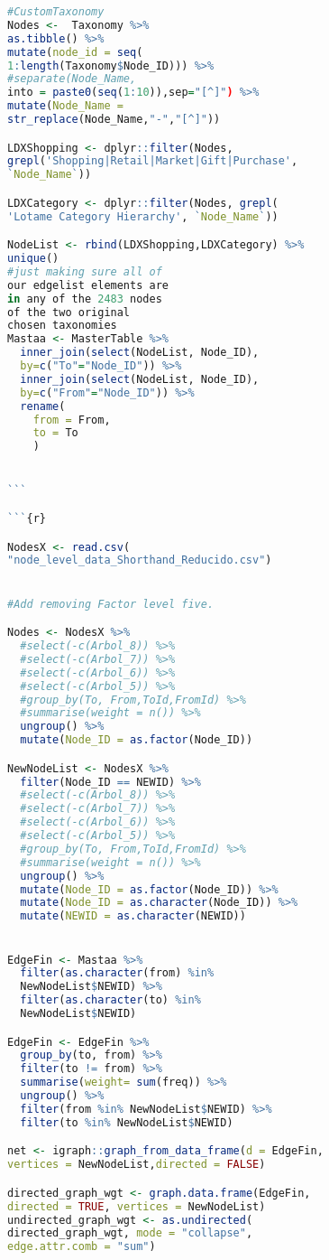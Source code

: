 \begin{lstlisting}[language=R]
#CustomTaxonomy
Nodes <-  Taxonomy %>% 
as.tibble() %>%
mutate(node_id = seq(
1:length(Taxonomy$Node_ID))) %>% 
#separate(Node_Name,
into = paste0(seq(1:10)),sep="[^]") %>% 
mutate(Node_Name = 
str_replace(Node_Name,"-","[^]"))

LDXShopping <- dplyr::filter(Nodes, 
grepl('Shopping|Retail|Market|Gift|Purchase',
`Node_Name`))

LDXCategory <- dplyr::filter(Nodes, grepl(
'Lotame Category Hierarchy', `Node_Name`))

NodeList <- rbind(LDXShopping,LDXCategory) %>% 
unique()
#just making sure all of 
our edgelist elements are 
in any of the 2483 nodes 
of the two original 
chosen taxonomies
Mastaa <- MasterTable %>% 
  inner_join(select(NodeList, Node_ID),
  by=c("To"="Node_ID")) %>% 
  inner_join(select(NodeList, Node_ID), 
  by=c("From"="Node_ID")) %>% 
  rename(
    from = From,
    to = To
    )


```

```{r}

NodesX <- read.csv(
"node_level_data_Shorthand_Reducido.csv")


#Add removing Factor level five.

Nodes <- NodesX %>% 
  #select(-c(Arbol_8)) %>% 
  #select(-c(Arbol_7)) %>% 
  #select(-c(Arbol_6)) %>% 
  #select(-c(Arbol_5)) %>% 
  #group_by(To, From,ToId,FromId) %>% 
  #summarise(weight = n()) %>% 
  ungroup() %>% 
  mutate(Node_ID = as.factor(Node_ID))

NewNodeList <- NodesX %>% 
  filter(Node_ID == NEWID) %>% 
  #select(-c(Arbol_8)) %>% 
  #select(-c(Arbol_7)) %>% 
  #select(-c(Arbol_6)) %>% 
  #select(-c(Arbol_5)) %>% 
  #group_by(To, From,ToId,FromId) %>% 
  #summarise(weight = n()) %>% 
  ungroup() %>% 
  mutate(Node_ID = as.factor(Node_ID)) %>% 
  mutate(Node_ID = as.character(Node_ID)) %>% 
  mutate(NEWID = as.character(NEWID))


EdgeFin <- Mastaa %>% 
  filter(as.character(from) %in% 
  NewNodeList$NEWID) %>% 
  filter(as.character(to) %in% 
  NewNodeList$NEWID)

EdgeFin <- EdgeFin %>% 
  group_by(to, from) %>% 
  filter(to != from) %>% 
  summarise(weight= sum(freq)) %>%
  ungroup() %>% 
  filter(from %in% NewNodeList$NEWID) %>% 
  filter(to %in% NewNodeList$NEWID)

net <- igraph::graph_from_data_frame(d = EdgeFin, 
vertices = NewNodeList,directed = FALSE)

directed_graph_wgt <- graph.data.frame(EdgeFin, 
directed = TRUE, vertices = NewNodeList)
undirected_graph_wgt <- as.undirected(
directed_graph_wgt, mode = "collapse",
edge.attr.comb = "sum")



\end{lstlisting}
